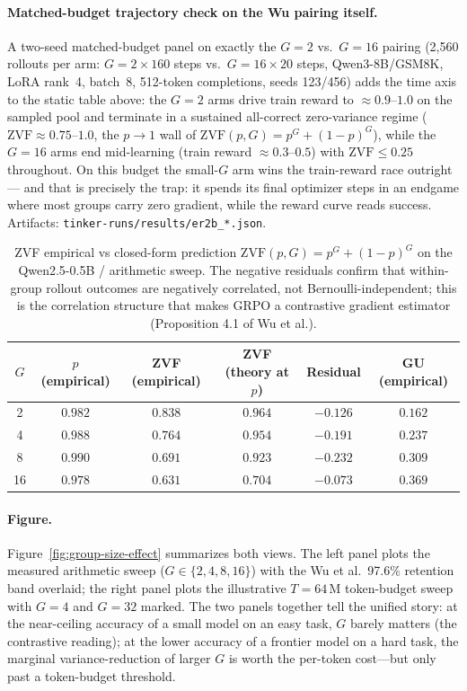 \documentclass{article}
\begin{document}
\paragraph{Matched-budget trajectory check on the Wu pairing itself.}
A two-seed matched-budget panel on exactly the $G{=}2$ vs.\ $G{=}16$
pairing (2{,}560 rollouts per arm: $G{=}2\times160$ steps vs.\
$G{=}16\times20$ steps, Qwen3-8B/GSM8K, LoRA rank~4, batch~8, 512-token
completions, seeds 123/456) adds the time axis to the static table
above: the $G{=}2$ arms drive train reward to $\approx0.9$--$1.0$ on the
sampled pool and terminate in a sustained all-correct zero-variance regime
($\mathrm{ZVF}\approx0.75$--$1.0$, the $p\to1$
wall of $\mathrm{ZVF}(p,G)=p^G+(1-p)^G$), while the $G{=}16$ arms end
mid-learning (train reward $\approx0.3$--$0.5$) with
$\mathrm{ZVF}\le0.25$ throughout. On this budget the small-$G$ arm wins
the train-reward race outright --- and that is precisely the trap: it
spends its final optimizer steps in an endgame where most groups carry
zero gradient, while the reward curve reads success. Artifacts:
\texttt{tinker-runs/results/er2b\_*.json}.

\begin{table}[htbp]
\centering
\small
\begin{tabular}{cccccc}
\toprule
$G$ & $p$ (empirical) & ZVF (empirical) & ZVF (theory at $p$) & Residual & GU (empirical) \\
\midrule
2  & $0.982$ & $0.838$ & $0.964$ & $-0.126$ & $0.162$ \\
4  & $0.988$ & $0.764$ & $0.954$ & $-0.191$ & $0.237$ \\
8  & $0.990$ & $0.691$ & $0.923$ & $-0.232$ & $0.309$ \\
16 & $0.978$ & $0.631$ & $0.704$ & $-0.073$ & $0.369$ \\
\bottomrule
\end{tabular}
\caption{ZVF empirical vs closed-form prediction
$\mathrm{ZVF}(p, G) = p^G + (1{-}p)^G$ on the Qwen2.5-0.5B /
arithmetic sweep. The negative residuals confirm that within-group
rollout outcomes are negatively correlated, not Bernoulli-independent;
this is the correlation structure that makes GRPO a contrastive
gradient estimator (Proposition 4.1 of Wu et al.).}
\label{tab:groupsize-zvf-theory}
\end{table}

\paragraph{Figure.}
Figure~\ref{fig:group-size-effect} summarizes both views. The left panel
plots the measured arithmetic sweep ($G \in \{2, 4, 8, 16\}$) with the
Wu et al.\ 97.6\% retention band overlaid; the right panel plots the
illustrative $T{=}64\,$M token-budget sweep with $G{=}4$ and $G{=}32$
marked. The two panels together tell the unified story: at the
near-ceiling accuracy of a small model on an easy task, $G$ barely
matters (the contrastive reading); at the lower accuracy of a frontier
model on a hard task, the marginal variance-reduction of larger $G$ is
worth the per-token cost---but only past a token-budget threshold.
\end{document}
